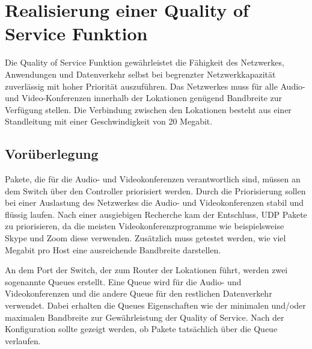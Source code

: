 \documentclass[fontsize=12pt,paper=a4,open=any,parskip=half,
  twoside=false,toc=listof,toc=bibliography,fleqn,leqno,
  captions=nooneline,captions=tableabove,british]{scrbook}
\begin{document}
\section{Realisierung einer Quality of Service Funktion}
Die Quality of Service Funktion gewährleistet die Fähigkeit des Netzwerkes, Anwendungen und Datenverkehr selbst bei begrenzter Netzwerkkapazität zuverlässig mit hoher Priorität auszuführen. Das Netzwerkes muss für alle Audio- und Video-Konferenzen innerhalb der Lokationen genügend Bandbreite zur Verfügung stellen. Die Verbindung zwischen den Lokationen besteht aus einer Standleitung mit einer Geschwindigkeit von 20 Megabit.

\subsection{Vorüberlegung}
Pakete, die für die Audio- und Videokonferenzen verantwortlich sind, müssen an dem Switch über den Controller priorisiert werden. Durch die Priorisierung sollen bei einer Auslastung des Netzwerkes die Audio- und Videokonferenzen stabil und flüssig laufen. Nach einer ausgiebigen Recherche kam der Entschluss, UDP Pakete zu priorisieren, da die meisten Videokonferenzprogramme wie beispielsweise Skype und Zoom diese verwenden. Zusätzlich muss getestet werden, wie viel Megabit pro Host eine ausreichende Bandbreite darstellen.\par
An dem Port der Switch, der zum Router der Lokationen führt, werden zwei sogenannte Queues erstellt. Eine Queue wird für die Audio- und Videokonferenzen und die andere Queue für den restlichen Datenverkehr verwendet. Dabei erhalten die Queues Eigenschaften wie der minimalen und/oder maximalen Bandbreite zur Gewährleistung der Quality of Service. Nach der Konfiguration sollte gezeigt werden, ob Pakete tatsächlich über die Queue verlaufen. 
\end{document}
